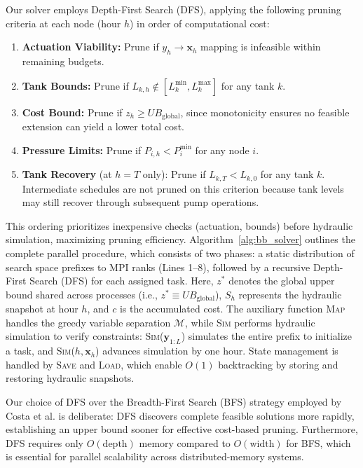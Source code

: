 \documentclass[a4paper,fleqn]{cas-dc}
\begin{document}
Our solver employs Depth-First Search (DFS), applying the following pruning criteria at each node (hour $h$) in order of computational cost:
\begin{enumerate}
	\item \textbf{Actuation Viability:} Prune if $y_h \to \mathbf{x}_h$ mapping is infeasible within remaining budgets.
	\item \textbf{Tank Bounds:} Prune if $L_{k,h} \notin [L_{k}^{\min}, L_{k}^{\max}]$ for any tank $k$.
	\item \textbf{Cost Bound:} Prune if $z_h \ge UB_{\text{global}}$, since monotonicity ensures no feasible extension can yield a lower total cost.
	\item \textbf{Pressure Limits:} Prune if $P_{i,h} < P_{i}^{\min}$ for any node $i$.
	\item \textbf{Tank Recovery} (at $h=T$ only): Prune if $L_{k,T} < L_{k,0}$ for any tank $k$. Intermediate schedules are not pruned on this criterion because tank levels may still recover through subsequent pump operations.
\end{enumerate}
This ordering prioritizes inexpensive checks (actuation, bounds) before hydraulic simulation, maximizing pruning efficiency. Algorithm~\ref{alg:bb_solver} outlines the complete parallel procedure, which consists of two phases: a static distribution of search space prefixes to MPI ranks (Lines 1--8), followed by a recursive Depth-First Search (DFS) for each assigned task. Here, $z^*$ denotes the global upper bound shared across processes (i.e., $z^* \equiv UB_{\text{global}}$), $S_h$ represents the hydraulic snapshot at hour $h$, and $c$ is the accumulated cost. The auxiliary function \textsc{Map} handles the greedy variable separation $\mathcal{M}$, while \textsc{Sim} performs hydraulic simulation to verify constraints: \textsc{Sim}($\mathbf{y}_{1:L}$) simulates the entire prefix to initialize a task, and \textsc{Sim}($h, \mathbf{x}_h$) advances simulation by one hour. State management is handled by \textsc{Save} and \textsc{Load}, which enable $O(1)$ backtracking by storing and restoring hydraulic snapshots.

Our choice of DFS over the Breadth-First Search (BFS) strategy employed by Costa et al. \cite{Costa2016} is deliberate: DFS discovers complete feasible solutions more rapidly, establishing an upper bound sooner for effective cost-based pruning. Furthermore, DFS requires only $O(\text{depth})$ memory compared to $O(\text{width})$ for BFS, which is essential for parallel scalability across distributed-memory systems.
\end{document}
